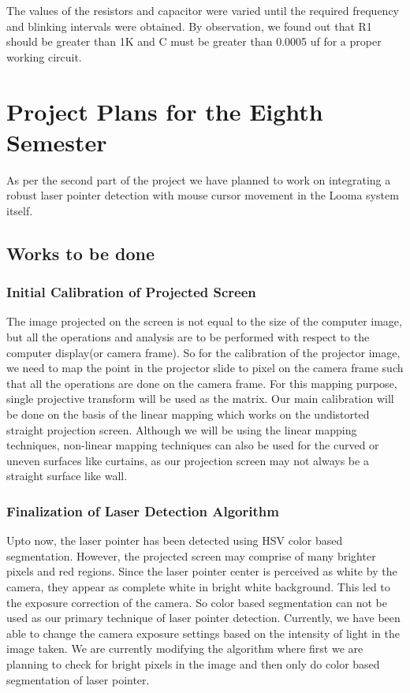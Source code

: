 \documentclass[12pt, a4paper]{article}
\begin{document}
	The values of the resistors and capacitor were varied until the required frequency and blinking intervals were obtained.
	By observation, we found out that R1 should be greater than 1K and C must be greater than 0.0005 uf for a proper working circuit.


\newpage
\section{Project Plans for the Eighth Semester}
	As per the second part of the project we have planned to work on integrating a robust laser pointer detection with mouse cursor movement in the Looma system itself. 

\subsection{Works to be done}

\subsubsection{Initial Calibration of Projected Screen}
	The image projected on the screen is not equal to the size of the computer image, but all the operations and analysis are to be performed with respect to the computer display(or camera frame). So for the calibration of the projector image, we need to map the point in the projector slide to pixel on the camera frame such that all the operations are done on the camera frame. For this mapping purpose, single projective transform will be used as the matrix. Our main calibration will be done on the basis of the linear mapping which works on the undistorted straight projection screen. 
	Although we will be using the linear mapping techniques, non-linear mapping techniques can also be used for the curved or uneven surfaces like curtains, as our projection screen may not always be a straight surface like wall.

\subsubsection{Finalization of Laser Detection Algorithm}
	Upto now, the laser pointer has been detected using HSV color based segmentation. However, the projected screen may comprise of many brighter pixels and red regions. Since the laser pointer center is perceived as white by the camera, they appear as complete white in bright white background. This led to the exposure correction of the camera. So color based segmentation can not be used as our primary technique of laser pointer detection. Currently, we have been able to change the camera exposure settings based on the intensity of light in the image taken. We are currently modifying the algorithm where first we are planning to check for bright pixels in the image and then only do color based segmentation of laser pointer.
\end{document}
